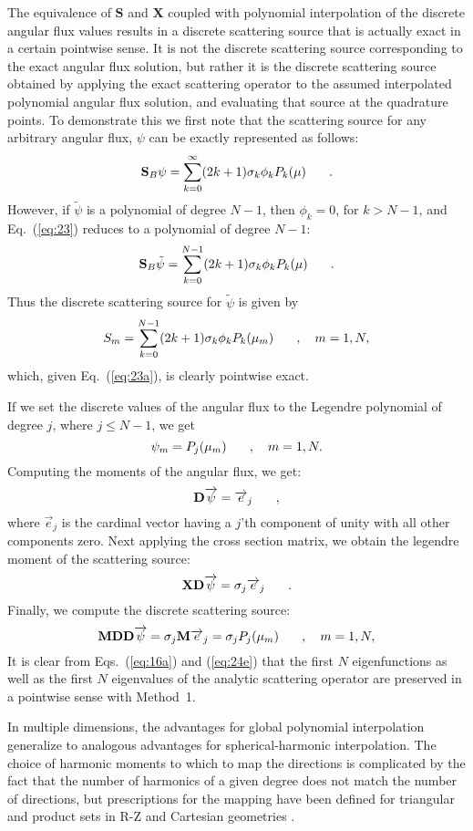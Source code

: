 \documentclass[12pt]{article}
\renewcommand{\vec}[1]{\overrightarrow{#1}}
\newcommand{\be}{\begin{equation}}
\newcommand{\ee}{\end{equation}}
\newcommand{\pec}{\hspace{0.25in},}
\newcommand{\pep}{\hspace{0.25in}.}
\newcommand{\LEQ}[1]{\label{eq:#1}}
\newcommand{\EQ}[1]{Eq.~(\ref{eq:#1})}
\newcommand{\REQ}[1]{\ref{eq:#1}}
\newcommand{\mS}{\mathbf{S}}
\newcommand{\mD}{\mathbf{D}}
\newcommand{\mM}{\mathbf{M}}
\newcommand{\mX}{\mathbf{X}}
\begin{document}
\begin{center}
The equivalence of $\mS$ and $\mX$ coupled with polynomial interpolation of the discrete angular flux values results in a 
discrete scattering source that is actually exact in a certain pointwise sense.  
It is not the discrete scattering source corresponding to the exact angular flux solution, but rather it is the 
discrete scattering source obtained by applying the exact scattering operator to the assumed interpolated polynomial angular flux solution, and evaluating that 
source at the quadrature points.  To demonstrate this we first note that the scattering source for any arbitrary angular flux, $\psi$ can be exactly represented 
as follows:
\be
\mS_B \psi = \sum_{k=0}^{\infty} (2k+1) \sigma_{k} \phi_k P_{k}(\mu) \pep 
\LEQ{23}
\ee
However, if $\tilde{\psi}$ is a polynomial of degree $N-1$, then $\phi_k = 0$, for $k>N-1$, and \EQ{23} reduces to a polynomial of degree $N-1$:
\be
\mS_B \tilde{\psi} = \sum_{k=0}^{N-1} (2k+1) \sigma_{k} \phi_k P_{k}(\mu) \pep 
\LEQ{23a}
\ee
Thus the discrete scattering source for $\tilde{\psi}$ is given by 
\be
S_m = \sum_{k=0}^{N-1} (2k+1) \sigma_k \phi_k P_k(\mu_m) \pec \quad m=1,N,
\LEQ{24}
\ee 
which, given \EQ{23a}, is clearly pointwise exact.


If we set the discrete values of the angular flux to the Legendre polynomial of degree $j$, where $j \le N-1$, we get
\be
\psi_{m} = P_j(\mu_m) \pec \quad m=1,N.
\LEQ{24b}
\ee
Computing the moments of the angular flux, we get: 
\be
\mD \vec{\psi} = \vec{e}_j \pec 
\LEQ{24c}
\ee
where $\vec{e}_j$ is the cardinal vector having a $j$'th component of unity with all other components zero.  Next applying the cross section matrix, we 
obtain the legendre moment of the scattering source: 
\be
\mX \mD \vec{\psi} = \sigma_j \vec{e}_j \pep
\LEQ{24d}
\ee
Finally, we compute the discrete scattering source:
\be
\mM \mD \mD \vec{\psi} = \sigma_j \mM \vec{e}_j = \sigma_j P_j(\mu_m) \pec \quad m=1,N, 
\LEQ{24e}
\ee
It is clear from Eqs.~(\REQ{16a}) and (\REQ{24e}) that the first $N$ eigenfunctions as well as 
the first $N$ eigenvalues of the analytic scattering operator are preserved in a pointwise sense with Method~1.

In multiple dimensions, the advantages for global polynomial interpolation generalize to analogous advantages for 
spherical-harmonic interpolation.  The choice of harmonic moments to which to map the directions is complicated by the 
fact that the number of harmonics of a given degree does not match the number of directions, but prescriptions for the 
mapping have been defined for triangular and product sets in R-Z and Cartesian geometries \cite{Morel89,Richard,Trahan}.



\end{center}
\end{document}
